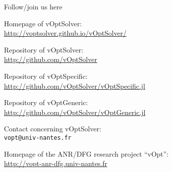 \documentclass[10pt,xcolor=dvipsnames]{beamer}
\begin{document}
%
% 
\begin{frame}{Follow/join us here}



{

Homepage of vOptSolver:\\
         \url{http://voptsolver.github.io/vOptSolver/}
\medskip

\quad Repository of vOptSolver:\\
\quad         \url{http://github.com/vOptSolver}
         
\quad Repository of vOptSpecific:\\
\quad         \url{http://github.com/vOptSolver/vOptSpecific.jl}

\quad Repository of vOptGeneric:\\
\quad         \url{http://github.com/vOptSolver/vOptGeneric.jl}              

\medskip


Contact concerning vOptSolver:\\
         \texttt{vopt@univ-nantes.fr}  \\
\vspace{4mm}

Homepage of the ANR/DFG research project ``vOpt'': \\
         \url{http://vopt-anr-dfg.univ-nantes.fr}


}

\end{frame}
\end{document}
